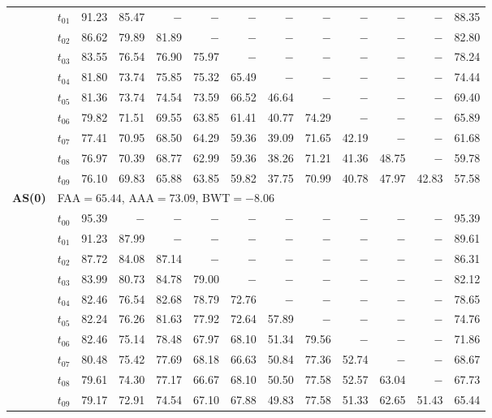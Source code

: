 \begin{table}[ht]
\begin{tabular}{@{}l l r r r r r r r r r r r@{}}
 & $t_{01}$ & 91.23 & 85.47 & $-$ & $-$ & $-$ & $-$ & $-$ & $-$ & $-$ & $-$ & 88.35 \\
 & $t_{02}$ & 86.62 & 79.89 & 81.89 & $-$ & $-$ & $-$ & $-$ & $-$ & $-$ & $-$ & 82.80 \\
 & $t_{03}$ & 83.55 & 76.54 & 76.90 & 75.97 & $-$ & $-$ & $-$ & $-$ & $-$ & $-$ & 78.24 \\
 & $t_{04}$ & 81.80 & 73.74 & 75.85 & 75.32 & 65.49 & $-$ & $-$ & $-$ & $-$ & $-$ & 74.44 \\
 & $t_{05}$ & 81.36 & 73.74 & 74.54 & 73.59 & 66.52 & 46.64 & $-$ & $-$ & $-$ & $-$ & 69.40 \\
 & $t_{06}$ & 79.82 & 71.51 & 69.55 & 63.85 & 61.41 & 40.77 & 74.29 & $-$ & $-$ & $-$ & 65.89 \\
 & $t_{07}$ & 77.41 & 70.95 & 68.50 & 64.29 & 59.36 & 39.09 & 71.65 & 42.19 & $-$ & $-$ & 61.68 \\
 & $t_{08}$ & 76.97 & 70.39 & 68.77 & 62.99 & 59.36 & 38.26 & 71.21 & 41.36 & 48.75 & $-$ & 59.78 \\
 & $t_{09}$ & 76.10 & 69.83 & 65.88 & 63.85 & 59.82 & 37.75 & 70.99 & 40.78 & 47.97 & 42.83 & 57.58 \\
\midrule
\multirow{11}{*}{\textbf{AS(0)}} & \multicolumn{12}{l}{\quad\small FAA$=65.44$,\; AAA$=73.09$,\; BWT$=-8.06$} \\
 & $t_{00}$ & 95.39 & $-$ & $-$ & $-$ & $-$ & $-$ & $-$ & $-$ & $-$ & $-$ & 95.39 \\
 & $t_{01}$ & 91.23 & 87.99 & $-$ & $-$ & $-$ & $-$ & $-$ & $-$ & $-$ & $-$ & 89.61 \\
 & $t_{02}$ & 87.72 & 84.08 & 87.14 & $-$ & $-$ & $-$ & $-$ & $-$ & $-$ & $-$ & 86.31 \\
 & $t_{03}$ & 83.99 & 80.73 & 84.78 & 79.00 & $-$ & $-$ & $-$ & $-$ & $-$ & $-$ & 82.12 \\
 & $t_{04}$ & 82.46 & 76.54 & 82.68 & 78.79 & 72.76 & $-$ & $-$ & $-$ & $-$ & $-$ & 78.65 \\
 & $t_{05}$ & 82.24 & 76.26 & 81.63 & 77.92 & 72.64 & 57.89 & $-$ & $-$ & $-$ & $-$ & 74.76 \\
 & $t_{06}$ & 82.46 & 75.14 & 78.48 & 67.97 & 68.10 & 51.34 & 79.56 & $-$ & $-$ & $-$ & 71.86 \\
 & $t_{07}$ & 80.48 & 75.42 & 77.69 & 68.18 & 66.63 & 50.84 & 77.36 & 52.74 & $-$ & $-$ & 68.67 \\
 & $t_{08}$ & 79.61 & 74.30 & 77.17 & 66.67 & 68.10 & 50.50 & 77.58 & 52.57 & 63.04 & $-$ & 67.73 \\
 & $t_{09}$ & 79.17 & 72.91 & 74.54 & 67.10 & 67.88 & 49.83 & 77.58 & 51.33 & 62.65 & 51.43 & 65.44 \\

\end{tabular}
\end{table}

